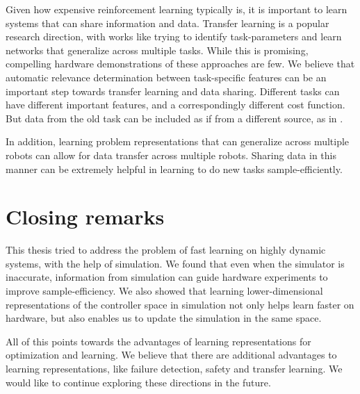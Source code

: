 Given how expensive reinforcement learning typically is, it is important to learn systems that can share information and data. Transfer learning is a popular research direction, with works like \cite{finn2017one} trying to identify task-parameters and learn networks that generalize across multiple tasks. While this is promising, compelling hardware demonstrations of these approaches are few. We believe that automatic relevance determination between task-specific features can be an important step towards transfer learning and data sharing. Different tasks can have different important features, and a correspondingly different cost function. But data from the old task can be included as if from a different source, as in \cite{poloczek2016multi}. 

In addition, learning problem representations that can generalize across multiple robots can allow for
data transfer across multiple robots. Sharing data in this manner can be extremely helpful in learning to do new tasks sample-efficiently. 

\section{Closing remarks}

This thesis tried to address the problem of fast learning on highly dynamic systems, with the help of simulation. We found that even when the simulator is inaccurate, information from simulation can guide hardware experiments to improve sample-efficiency. We also showed that learning lower-dimensional representations of the controller space in simulation not only helps learn faster on hardware, but also enables us to update the simulation in the same space. 

All of this points towards the advantages of learning representations for optimization and learning. We believe that there are additional advantages to learning representations, like failure detection, safety and transfer learning. We would like to continue exploring these directions in the future.